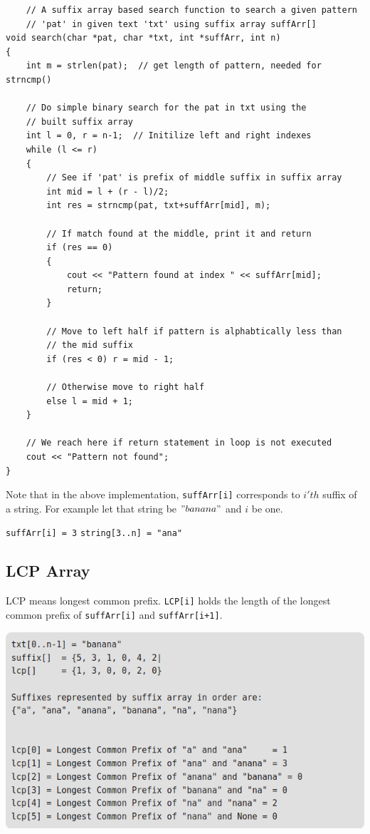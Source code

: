 \documentclass[12pt]{article}
\begin{document}
\begin{verbatim}
    // A suffix array based search function to search a given pattern 
    // 'pat' in given text 'txt' using suffix array suffArr[] 
void search(char *pat, char *txt, int *suffArr, int n) 
{ 
    int m = strlen(pat);  // get length of pattern, needed for strncmp() 
  
    // Do simple binary search for the pat in txt using the 
    // built suffix array 
    int l = 0, r = n-1;  // Initilize left and right indexes 
    while (l <= r) 
    { 
        // See if 'pat' is prefix of middle suffix in suffix array 
        int mid = l + (r - l)/2; 
        int res = strncmp(pat, txt+suffArr[mid], m); 
  
        // If match found at the middle, print it and return 
        if (res == 0) 
        { 
            cout << "Pattern found at index " << suffArr[mid]; 
            return; 
        } 
  
        // Move to left half if pattern is alphabtically less than 
        // the mid suffix 
        if (res < 0) r = mid - 1; 
  
        // Otherwise move to right half 
        else l = mid + 1; 
    } 
  
    // We reach here if return statement in loop is not executed 
    cout << "Pattern not found"; 
} 
\end{verbatim}

    Note that in the above implementation, \texttt{suffArr[i]} corresponds to $i'th$ suffix of a string. For example let that string be $"banana"$ and $i$ be one.
    
    \texttt{suffArr[i] = 3}
    \texttt{string[3..n] = "ana"}
    
    \newpage
    
    	\subsection{LCP Array}
    	LCP means longest common prefix. \texttt{LCP[i]} holds the length of the longest common prefix of \texttt{suffArr[i]} and \texttt{suffArr[i+1]}.
    	
    	\includegraphics[width=\linewidth/1]{lcp.png}
    	
\end{document}

